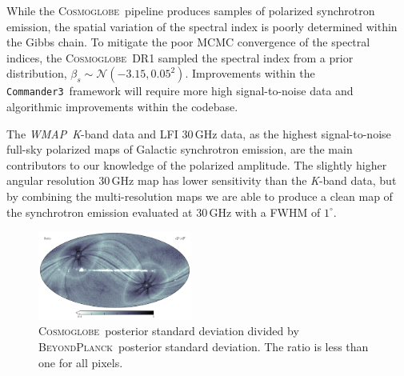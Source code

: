 \documentclass[twocolumn]{../../common/aa}
\def\WMAP{\emph{WMAP}}
\def\WMAPnine{\emph{WMAP9}}
\def\Planck{\emph{Planck}}
\def\commanderthree{\texttt{Commander3}}
\newcommand{\bp}{\textsc{BeyondPlanck}}
\newcommand{\cosmoglobe}{\textsc{Cosmoglobe}}
\newcommand{\K}[0]{\textit K}
\begin{document}
While the \cosmoglobe\ pipeline produces samples of polarized synchrotron emission, the spatial variation of the spectral index is poorly determined within the Gibbs chain. To mitigate the poor MCMC convergence of the spectral indices, the \cosmoglobe\ DR1 sampled the spectral index from a prior distribution, $\beta_s\sim\mathcal N(-3.15, 0.05^2)$. Improvements within the \commanderthree\ framework will require more high signal-to-noise data and algorithmic improvements within the codebase.



The \WMAP\ \K-band data and LFI 30\,GHz data, as the highest signal-to-noise full-sky polarized maps of Galactic synchrotron emission, are the main contributors to our knowledge of the polarized amplitude. The slightly higher angular resolution 30\,GHz map has lower sensitivity than the \K-band data, but by combining the multi-resolution maps we are able to produce a clean map of the synchrotron emission evaluated at 30\,GHz with a FWHM of $1^\circ$.




\begin{figure}
	\centering
	\includegraphics[width=0.45\textwidth]{figures/polint_sigma_ratio.pdf}
	\caption{
		\cosmoglobe\ posterior standard deviation divided by \bp\ posterior standard deviation. The ratio is less than one for all pixels.
		}
		\label{fig:rms_ratios}
\end{figure}
\end{document}
